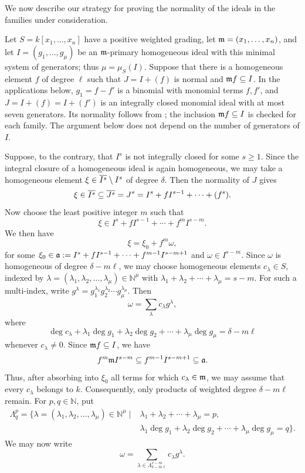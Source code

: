 We now describe our strategy for proving the normality of the ideals in the families under consideration.


Let $S=k[x_1,\ldots,x_n]$ have a positive weighted grading, let
$\mathfrak m=(x_1,\ldots,x_n)$, and let $I=(g_1,\ldots,g_\mu)$ be an
$\mathfrak m$-primary homogeneous ideal with this minimal system of generators;
thus $\mu=\mu_S(I)$. Suppose that there is a homogeneous element
$f$ of degree $\ell$ such that $J=I+(f)$ is normal and $\mathfrak m f\subseteq I$.
In the applications below, $g_1=f-f'$ is a binomial with monomial terms
$f,f'$, and $J=I+(f)=I+(f')$ is an integrally closed monomial ideal
with at most seven generators. Its normality follows from
\cite{AtakaMatsuoka2026}; the inclusion $\mathfrak m f\subseteq I$ is checked
for each family. The argument below does not depend on the number of generators of $I$.

Suppose, to the contrary, that $I^s$ is not integrally closed for some $s\geq1$.
Since the integral closure of a homogeneous ideal is again homogeneous, 
we may take a homogeneous element
$\xi\in\overline{I^s}\setminus I^s$
of degree $\delta$. 
Then the normality of $J$ gives
$$
 \xi\in \overline{I^s} \subseteq \overline{J^s} = J^s
 = I^s + fI^{s-1} + \cdots + (f^s).
$$
Now choose the least positive integer $m$ such that
$$
 \xi\in I^s+fI^{s-1}+\cdots+f^m I^{s-m}.
$$
We then have
$$
 \xi=\xi_0+f^m\omega,
$$
for some $\xi_0\in \mathfrak{a} := I^s+fI^{s-1}+\cdots+f^{m-1}I^{s-m+1}$ and $\omega\in I^{s-m}$.
Since $\omega$ is homogeneous of degree $\delta-m\ell$, we may choose homogeneous elements $c_\lambda\in S$, indexed by $\lambda=(\lambda_1,\lambda_2,\ldots,\lambda_{\mu})\in\mathbb N^{\mu}$ with $\lambda_1+\lambda_2+\cdots+\lambda_{\mu}=s-m$.  For such a multi-index, write $g^\lambda=g_1^{\lambda_1}g_2^{\lambda_2}\cdots g_{\mu}^{\lambda_{\mu}}$.  Then
$$
\omega=\sum_{\lambda}c_\lambda g^\lambda,
$$
where
$$
\deg c_\lambda+\lambda_1\deg g_1+\lambda_2\deg g_2+\cdots+\lambda_{\mu}\deg g_{\mu}=\delta-m\ell
$$
whenever $c_\lambda\ne0$.  Since $\mathfrak m f\subseteq I$, we have
$$
f^m\mathfrak m I^{s-m}\subseteq f^{m-1}I^{s-m+1}\subseteq\mathfrak{a}.
$$
Thus, after absorbing into $\xi_0$ all terms for which $c_\lambda\in\mathfrak m$, we may assume that every $c_\lambda$ belongs to $k$.  Consequently, only products of weighted degree $\delta-m\ell$ remain.  For $p,q\in\mathbb N$, put
$$
\begin{aligned}
\Lambda^p_q
=\{\lambda = (\lambda_1,\lambda_2,\ldots,\lambda_{\mu})\in\mathbb N^{\mu}\mid {}&
\lambda_1+\lambda_2+\cdots+\lambda_{\mu}=p,\\
&\lambda_1\deg g_1+\lambda_2\deg g_2+\cdots+\lambda_{\mu}\deg g_{\mu}=q\}.
\end{aligned}
$$
We may now write
$$
\omega=\sum_{\lambda\in\Lambda^{s-m}_{\delta-m\ell}}c_\lambda g^\lambda.
$$

